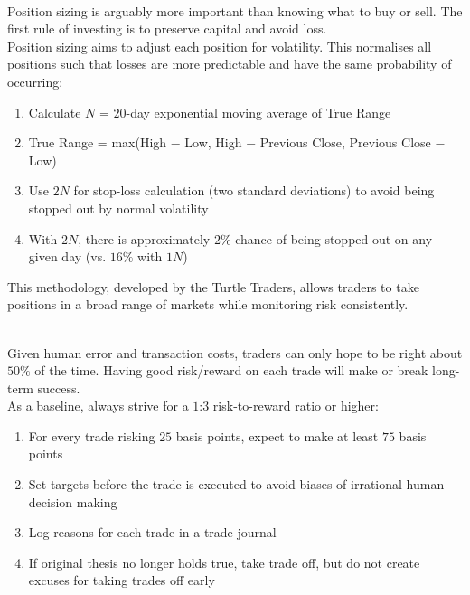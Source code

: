 \documentclass[a4paper,oneside,openany]{book}
\begin{document}
\begin{remark} \\
Position sizing is arguably more important than knowing what to buy or sell. The first rule of investing is to preserve capital and avoid loss.\\
Position sizing aims to adjust each position for volatility. This normalises all positions such that losses are more predictable and have the same probability of occurring:
\begin{enumerate}[label=\roman*.]
\setlength{\itemsep}{0pt}
\item Calculate $N$ = $20$-day exponential moving average of True Range
\item True Range = max(High $-$ Low, High $-$ Previous Close, Previous Close $-$ Low)
\item Use $2N$ for stop-loss calculation (two standard deviations) to avoid being stopped out by normal volatility
\item With $2N$, there is approximately $2\%$ chance of being stopped out on any given day (vs. $16\%$ with $1N$)
\end{enumerate}
This methodology, developed by the Turtle Traders, allows traders to take positions in a broad range of markets while monitoring risk consistently.
\end{remark}

\begin{remark} \\
Given human error and transaction costs, traders can only hope to be right about $50\%$ of the time. Having good risk/reward on each trade will make or break long-term success.\\
As a baseline, always strive for a $1$:$3$ risk-to-reward ratio or higher:
\begin{enumerate}[label=\roman*.]
\setlength{\itemsep}{0pt}
\item For every trade risking $25$ basis points, expect to make at least $75$ basis points
\item Set targets before the trade is executed to avoid biases of irrational human decision making
\item Log reasons for each trade in a trade journal
\item If original thesis no longer holds true, take trade off, but do not create excuses for taking trades off early
\end{enumerate}
\end{remark}
\end{document}
